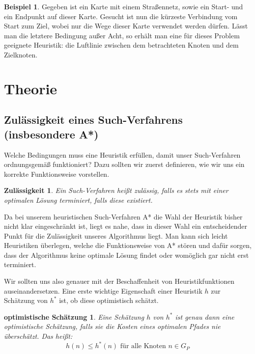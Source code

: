 \theoremstyle{definition}
\newtheorem*{bsp}{Beispiel}
\begin{bsp}
	Gegeben ist ein Karte mit einem Straßennetz, sowie ein Start- und ein Endpunkt auf dieser Karte. Gesucht ist nun die kürzeste Verbindung vom Start zum Ziel, wobei nur die Wege dieser Karte verwendet werden dürfen. Lässt man die letztere Bedingung außer Acht, so erhält man eine für dieses Problem geeignete Heuristik: die Luftlinie zwischen dem betrachteten Knoten und dem Zielknoten.
\end{bsp}

\section{Theorie} \label{theo}

\theoremstyle{plain} %
\newtheorem*{zul}{Zulässigkeit}
\newtheorem*{os}{optimistische Schätzung}
\newtheorem*{zula}{Zulässigkeit von A*}

\subsection{Zulässigkeit eines Such-Verfahrens (insbesondere A*)}

Welche Bedingungen muss eine Heuristik erfüllen, damit unser Such-Verfahren ordnungsgemäß funktioniert? Dazu sollten wir zuerst definieren, wie wir uns ein korrekte Funktionsweise vorstellen.

\begin{zul}
	Ein Such-Verfahren heißt zulässig, falls es stets mit einer optimalen Lösung terminiert, falls diese existiert.
\end{zul}

Da bei unserem heuristischen Such-Verfahren A* die Wahl der Heuristik bisher nicht klar eingeschränkt ist, liegt es nahe, dass in dieser Wahl ein entscheidender Punkt für die Zulässigkeit unseres Algorithmus liegt. Man kann sich leicht Heuristiken überlegen, welche die Funktionsweise von A* stören und dafür sorgen, dass der Algorithmus keine optimale Lösung findet oder womöglich gar nicht erst terminiert.

Wir sollten uns also genauer mit der Beschaffenheit von Heuristikfunktionen auseinandersetzen.
Eine erste wichtige Eigenschaft einer Heuristik $h$ zur Schätzung von $h^{*}$ ist, ob diese optimistisch schätzt.

\begin{os}
Eine Schätzung $h$ von $h^{*}$ ist genau dann eine optimistische Schätzung, falls sie die Kosten eines optimalen Pfades nie überschätzt. Das heißt:
\[h(n) \leq h^{*}(n) \textrm{ für alle Knoten } n \in G_{P}\]
\end{os}

